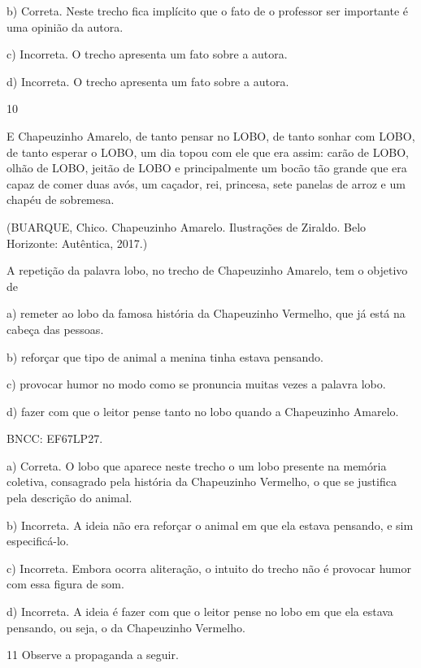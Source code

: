b) Correta. Neste trecho fica implícito que o fato de o professor ser
importante é uma opinião da autora.

c) Incorreta. O trecho apresenta um fato sobre a autora.

d) Incorreta. O trecho apresenta um fato sobre a autora.

\num{10}

E Chapeuzinho Amarelo, de tanto pensar no LOBO, de tanto sonhar com
LOBO, de tanto esperar o LOBO, um dia topou com ele que era assim: carão
de LOBO, olhão de LOBO, jeitão de LOBO e principalmente um bocão tão
grande que era capaz de comer duas avós, um caçador, rei, princesa, sete
panelas de arroz e um chapéu de sobremesa.

(BUARQUE, Chico. Chapeuzinho Amarelo. Ilustrações de Ziraldo. Belo
Horizonte: Autêntica, 2017.)

A repetição da palavra lobo, no trecho de Chapeuzinho Amarelo, tem o
objetivo de

a) remeter ao lobo da famosa história da Chapeuzinho Vermelho, que já
está na cabeça das pessoas.

b) reforçar que tipo de animal a menina tinha estava pensando.

c) provocar humor no modo como se pronuncia muitas vezes a palavra lobo.

d) fazer com que o leitor pense tanto no lobo quando a Chapeuzinho
Amarelo.

BNCC: EF67LP27.

a) Correta. O lobo que aparece neste trecho o um lobo presente na
memória coletiva, consagrado pela história da Chapeuzinho Vermelho, o
que se justifica pela descrição do animal.

b) Incorreta. A ideia não era reforçar o animal em que ela estava
pensando, e sim especificá-lo.

c) Incorreta. Embora ocorra aliteração, o intuito do trecho não é
provocar humor com essa figura de som.

d) Incorreta. A ideia é fazer com que o leitor pense no lobo em que ela
estava pensando, ou seja, o da Chapeuzinho Vermelho.

\num{11} Observe a propaganda a seguir.

